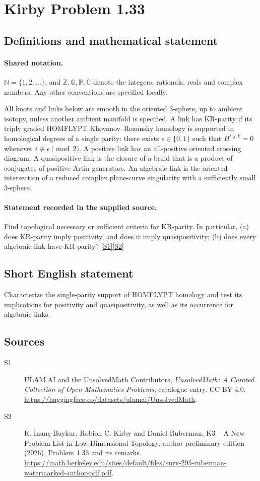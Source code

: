 \documentclass[11pt]{article}
\newcommand{\sref}[2]{\hyperlink{source:#1:#2}{[S#2]}}
\begin{document}
\section{Kirby Problem 1.33}\label{statement}

\subsection{Definitions and mathematical statement}

\paragraph{Shared notation.}$\mathbb N=\{1,2,\ldots\}$, and $\mathbb Z,\mathbb Q,\mathbb R,\mathbb C$ denote the integers, rationals, reals and complex numbers. Any other conventions are specified locally.


All knots and links below are smooth in the oriented $3$-sphere, up to ambient isotopy, unless another ambient manifold is specified. A link has KR-parity if its triply graded HOMFLYPT Khovanov--Rozansky homology is supported in homological degrees of a single parity: there exists $\epsilon\in\{0,1\}$ such that $H^{i,j,k}=0$ whenever $i\not\equiv\epsilon\pmod2$. A positive link has an all-positive oriented crossing diagram. A quasipositive link is the closure of a braid that is a product of conjugates of positive Artin generators. An algebraic link is the oriented intersection of a reduced complex plane-curve singularity with a sufficiently small $3$-sphere.
\paragraph{Statement recorded in the supplied source.}
Find topological necessary or sufficient criteria for KR-parity. In particular, (a) does KR-parity imply positivity, and does it imply quasipositivity; (b) does every algebraic link have KR-parity? \sref{statement}{1}\sref{statement}{2}
\subsection{Short English statement}
Characterize the single-parity support of HOMFLYPT homology and test its implications for positivity and quasipositivity, as well as its occurrence for algebraic links.
\subsection{Sources}
\begin{description}
\item[\hypertarget{source:statement:1}{S1}] ULAM.AI and the UnsolvedMath Contributors, \emph{UnsolvedMath: A Curated Collection of Open Mathematics Problems}, catalogue entry. CC BY 4.0. \url{https://huggingface.co/datasets/ulamai/UnsolvedMath}.
\item[\hypertarget{source:statement:2}{S2}] R. \.{I}nan\c{c} Baykur, Robion C. Kirby and Daniel Ruberman, K3 -- A New Problem List in Low-Dimensional Topology, author preliminary edition (2026), Problem 1.33 and its remarks. \url{https://math.berkeley.edu/sites/default/files/surv-295-ruberman-watermarked-author-pdf.pdf}.
\end{description}
\label{end:statement}
\end{document}
